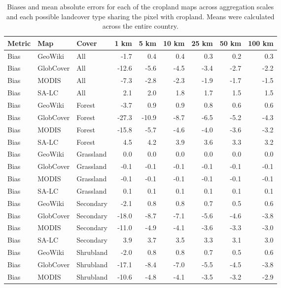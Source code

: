 \begin{longtable}{lllrrrrrr}
\caption{Biases and mean absolute errors for each of the cropland maps across aggregation scales and each possible landcover type sharing the pixel with cropland. Means were calculated across the entire country.} \\ 
  \hline
Metric & Map & Cover & 1 km & 5 km & 10 km & 25 km & 50 km & 100 km \\ 
  \hline
Bias & GeoWiki & All & -1.7 & 0.4 & 0.4 & 0.3 & 0.2 & 0.3 \\ 
  Bias & GlobCover & All & -12.6 & -5.6 & -4.5 & -3.4 & -2.7 & -2.2 \\ 
  Bias & MODIS & All & -7.3 & -2.8 & -2.3 & -1.9 & -1.7 & -1.5 \\ 
  Bias & SA-LC & All & 2.1 & 2.0 & 1.8 & 1.7 & 1.5 & 1.5 \\ 
  Bias & GeoWiki & Forest & -3.7 & 0.9 & 0.9 & 0.8 & 0.6 & 0.6 \\ 
  Bias & GlobCover & Forest & -27.3 & -10.9 & -8.7 & -6.5 & -5.2 & -4.3 \\ 
  Bias & MODIS & Forest & -15.8 & -5.7 & -4.6 & -4.0 & -3.6 & -3.2 \\ 
  Bias & SA-LC & Forest & 4.5 & 4.2 & 3.9 & 3.6 & 3.3 & 3.2 \\ 
  Bias & GeoWiki & Grassland & 0.0 & 0.0 & 0.0 & 0.0 & 0.0 & 0.0 \\ 
  Bias & GlobCover & Grassland & -0.1 & -0.1 & -0.1 & -0.1 & -0.1 & -0.1 \\ 
  Bias & MODIS & Grassland & -0.1 & -0.1 & -0.1 & -0.1 & -0.1 & -0.1 \\ 
  Bias & SA-LC & Grassland & 0.1 & 0.1 & 0.1 & 0.1 & 0.1 & 0.1 \\ 
  Bias & GeoWiki & Secondary & -2.1 & 0.8 & 0.8 & 0.7 & 0.5 & 0.6 \\ 
  Bias & GlobCover & Secondary & -18.0 & -8.7 & -7.1 & -5.6 & -4.6 & -3.8 \\ 
  Bias & MODIS & Secondary & -11.0 & -4.9 & -4.1 & -3.6 & -3.3 & -3.0 \\ 
  Bias & SA-LC & Secondary & 3.9 & 3.7 & 3.5 & 3.3 & 3.1 & 3.0 \\ 
  Bias & GeoWiki & Shrubland & -2.0 & 0.8 & 0.8 & 0.7 & 0.5 & 0.6 \\ 
  Bias & GlobCover & Shrubland & -17.1 & -8.4 & -7.0 & -5.5 & -4.5 & -3.8 \\ 
  Bias & MODIS & Shrubland & -10.6 & -4.8 & -4.1 & -3.5 & -3.2 & -2.9 \\ 

\end{longtable}
